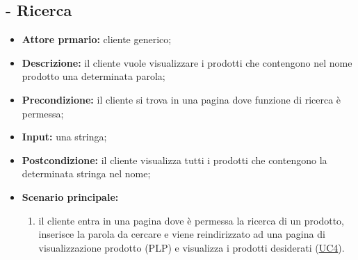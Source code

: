 \stepUserCase
\subsection{ - Ricerca}
\begin{itemize}
    \item \textbf{Attore prmario:} cliente generico;
    \item \textbf{Descrizione:} il cliente vuole visualizzare i prodotti che contengono nel nome prodotto una determinata parola;
    \item \textbf{Precondizione:} il cliente si trova in una pagina dove funzione di ricerca è permessa;
    \item \textbf{Input:} una stringa;
    \item \textbf{Postcondizione:} il cliente visualizza tutti i prodotti che contengono la determinata stringa nel nome;
    \item \textbf{Scenario principale:}
          \begin{enumerate}
              \item il cliente entra in una pagina dove è permessa la ricerca di un prodotto, inserisce la parola da cercare e viene reindirizzato ad una pagina di visualizzazione prodotto (PLP) e visualizza i prodotti desiderati (\hyperref[UC4]{UC4}).
          \end{enumerate}
\end{itemize}

\stepUserCase
